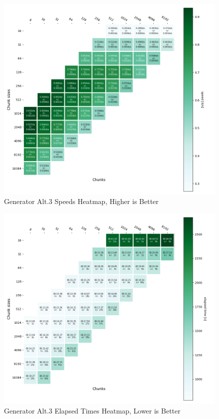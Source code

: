 \documentclass[pdfa%
,cucitura%
]{toptesi}
\begin{document}
\begin{figure}[h!]
	\centering
	\includegraphics[width=\textwidth]{./images/speeds_heatmap.png}
	\caption[Generator alt.3 speed heatmap]{Generator Alt.3 Speeds Heatmap, Higher is Better}
	\label{fig:speeds_heatmap}
\end{figure}

\begin{figure}[h!]
	\centering
	\includegraphics[width=\textwidth]{./images/times_heatmap.png}
	\caption[Generator alt.3 elapsed times heatmap]{Generator Alt.3 Elapsed Times Heatmap, Lower is Better}
	\label{fig:times_heatmap}
\end{figure}
\end{document}
